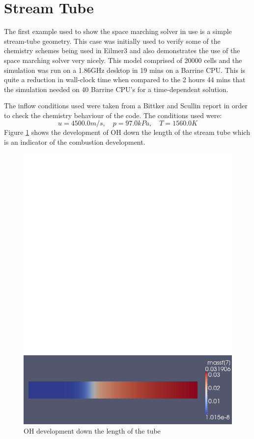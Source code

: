 
\newpage
\section{Stream Tube}
\label{chap2-stream-tube}
%

The first example used to show the space marching solver in use is a simple stream-tube geometry. This case was initially used to verify some of the chemistry schemes being used in Eilmer3 and also demonstrates the use of the space marching solver very nicely. This model comprised of 20000 cells and the simulation was run on a 1.86GHz desktop in 19 mins on a Barrine CPU. This is quite a reduction in wall-clock time when compared to the 2 hours 44 mins that the simulation needed on 40 Barrine CPU's for a time-dependent solution.

The inflow conditions used were taken from a Bittker and Scullin report\cite{Bittker_Scullin72} in order to check the chemistry behaviour of the code. The conditions used were: \[ u = 4500.0m/s, \quad p = 97.0kPa, \quad T = 1560.0K \] Figure \ref{fig:stream_tube_OH} shows the development of OH down the length of the stream tube which is an indicator of the combustion development.

\begin{figure}[h]
 \centering
 \includegraphics[width=0.9\linewidth]{./chap2-stream-tube/stream_tube.pdf}
 \caption{OH development down the length of the tube}
 \label{fig:stream_tube_OH}
\end{figure}

